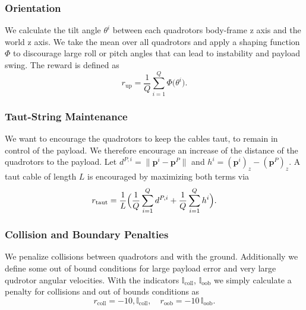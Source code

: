 \subsubsection{Orientation}
We calculate the tilt angle \(\theta^i\) between each quadrotors body-frame z axis and the world z axis. We take the mean over all quadrotors and apply a shaping function \(\Phi\) to discourage large roll or pitch angles that can lead to instability and payload swing. The reward is defined as
\begin{equation}
r_{\mathrm{up}}
= \frac{1}{Q}\sum_{i=1}^Q \Phi\bigl(\theta^i\bigr).
\end{equation}

\subsubsection{Taut-String Maintenance}
We want to encourage the quadrotors to keep the cables taut, to remain in control of the payload. We therefore encourage an increase of the distance of the quadrotors to the payload. Let \(d^{P,i}=\lVert\mathbf{p}^i-\mathbf{p}^P\rVert\) and \(h^i=(\mathbf{p}^i)_z-(\mathbf{p}^P)_z\). A taut cable of length \(L\) is encouraged by maximizing both terms via
\begin{equation}
r_{\mathrm{taut}}
= \frac{1}{L}\Bigl(\frac{1}{Q}\sum_{i=1}^Q d^{P,i} + \frac{1}{Q}\sum_{i=1}^Q h^i\Bigr).
\end{equation}


\subsubsection{Collision and Boundary Penalties}
We penalize collisions between quadrotors and with the ground. Additionally we define some out of bound conditions for large payload error and very large qudrotor angular velocities.
With the indicators \(\mathbb{I}_{\mathrm{coll}}\), \(\mathbb{I}_{\mathrm{oob}}\) we simply calculate a penalty for collisions and out of bounds conditions as
\begin{equation}
r_{\mathrm{coll}} = -10,\mathbb{I}_{\mathrm{coll}}, 
\quad
r_{\mathrm{oob}} = -10\,\mathbb{I}_{\mathrm{oob}}.
\end{equation}

